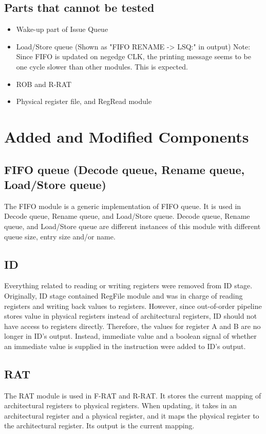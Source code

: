 \documentclass[a4paper,11pt]{article}
\begin{document}
\subsection{Parts that cannot be tested}
\begin{itemize}
  \item Wake-up part of Issue Queue
  \item Load/Store queue (Shown as "FIFO RENAME -> LSQ:" in output) Note: Since FIFO is updated on negedge CLK, the printing message seems to be one cycle slower than other modules. This is expected.
  \item ROB and R-RAT
  \item Physical register file, and RegRead module
\end{itemize}

\section{Added and Modified Components}
\subsection{FIFO queue (Decode queue, Rename queue, Load/Store queue)}
The FIFO module is a generic implementation of FIFO queue. It is used in Decode queue, Rename queue, and Load/Store queue. Decode queue, Rename queue, and Load/Store queue are different instances of this module with different queue size, entry size and/or name.

\subsection{ID}
Everything related to reading or writing registers were removed from ID stage. Originally, ID stage contained RegFile module and was in charge of reading registers and writing back values to registers. However, since out-of-order pipeline stores value in physical registers instead of architectural registers, ID should not have access to registers directly. Therefore, the values for register A and B are no longer in ID's output. Instead, immediate value and a boolean signal of whether an immediate value is supplied in the instruction were added to ID's output.

\subsection{RAT}
The RAT module is used in F-RAT and R-RAT. It stores the current mapping of architectural registers to physical registers. When updating, it takes in an architectural register and a physical register, and it maps the physical register to the architectural register. Its output is the current mapping.
\end{document}
